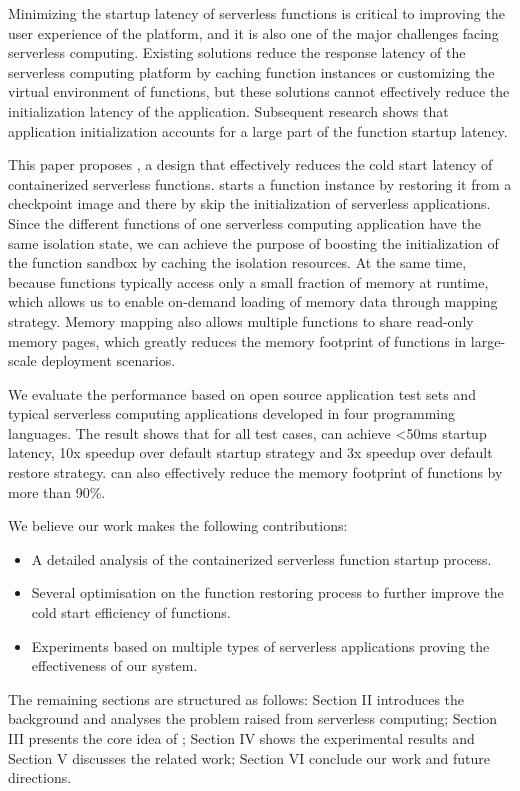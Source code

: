 Minimizing the startup latency of serverless functions is critical to improving the user experience of the platform\cite{serverless-user-experience-1,serverless-user-experience-2},
and it is also one of the major challenges facing serverless computing\cite{berkeley-view,serverless-trends}.
Existing solutions reduce the response latency of the serverless computing platform by caching function instances\cite{pool1,pool2} or customizing the virtual environment of functions\cite{firecracker,faasm},
but these solutions cannot effectively reduce the initialization latency of the application.
Subsequent research shows that application initialization accounts for a large part of the function startup latency.


This paper proposes \pname, 
a design that effectively reduces the cold start latency of containerized serverless functions. 
\pname starts a function instance by restoring it from a checkpoint image and there by skip the initialization of serverless applications. 
Since the different functions of one serverless computing application have the same isolation state, 
we can achieve the purpose of boosting the initialization of the function sandbox by caching the isolation resources. 
At the same time, because functions typically access only a small fraction of memory at runtime, 
which allows us to enable on-demand loading of memory data through mapping strategy. 
Memory mapping also allows multiple functions to share read-only memory pages, 
which greatly reduces the memory footprint of functions in large-scale deployment scenarios.

We evaluate the performance based on open source application test sets and typical serverless computing applications developed in four programming languages.
The result shows that for all test cases, \pname can achieve <50ms startup latency, 
10x speedup over default startup strategy 
and 3x speedup over default restore strategy. 
\pname can also effectively reduce the memory footprint of 
functions by more than 90\%.

We believe our work makes the following contributions:

\begin{itemize}
    \item A detailed analysis of the containerized serverless function startup process.
    \item Several optimisation on the function restoring process to further improve the cold start efficiency of functions.
    \item Experiments based on multiple types of serverless applications proving the effectiveness of our system.
\end{itemize}


The remaining sections are structured as follows: 
Section II introduces the background and analyses the problem raised from serverless computing; 
Section III presents the core idea of \pname; 
Section IV shows the experimental results and Section V discusses the related work; 
Section VI conclude our work and future directions.